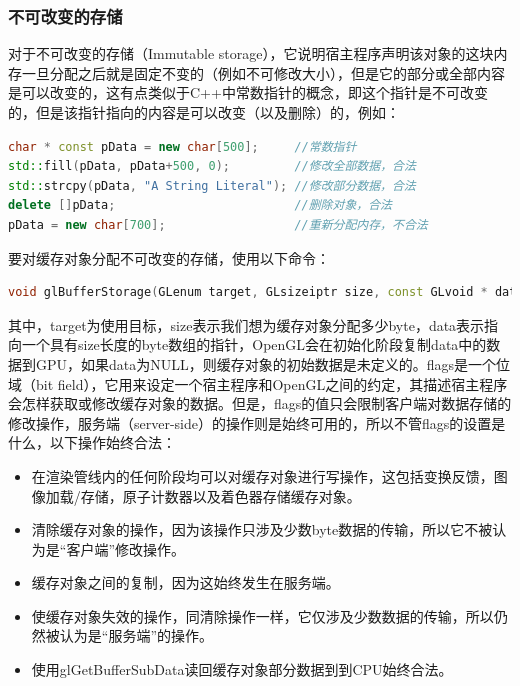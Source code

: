 \subsubsection{不可改变的存储}
对于不可改变的存储（Immutable storage），它说明宿主程序声明该对象的这块内存一旦分配之后就是固定不变的（例如不可修改大小），但是它的部分或全部内容是可以改变的，这有点类似于C++中常数指针的概念，即这个指针是不可改变的，但是该指针指向的内容是可以改变（以及删除）的，例如：

\begin{lstlisting}[language=C++]
char * const pData = new char[500];     //常数指针
std::fill(pData, pData+500, 0);         //修改全部数据，合法
std::strcpy(pData, "A String Literal"); //修改部分数据，合法
delete []pData;                         //删除对象，合法
pData = new char[700];                  //重新分配内存，不合法
\end{lstlisting}

要对缓存对象分配不可改变的存储，使用以下命令：

\begin{lstlisting}[language=C++]
void glBufferStorage​(GLenum target​, GLsizeiptr size​, const GLvoid * data​, GLbitfield flags​);
\end{lstlisting}

其中，target为使用目标，size表示我们想为缓存对象分配多少byte，data表示指向一个具有size长度的byte数组的指针，OpenGL会在初始化阶段复制data中的数据到GPU，如果data为NULL，则缓存对象的初始数据是未定义的。flags是一个位域（bit field），它用来设定一个宿主程序和OpenGL之间的约定，其描述宿主程序会怎样获取或修改缓存对象的数据。但是，flags的值只会限制客户端对数据存储的修改操作，服务端（server-side）的操作则是始终可用的，所以不管flags的设置是什么，以下操作始终合法：

\begin{itemize}
	\item 在渲染管线内的任何阶段均可以对缓存对象进行写操作，这包括变换反馈，图像加载/存储，原子计数器以及着色器存储缓存对象。
	\item 清除缓存对象的操作，因为该操作只涉及少数byte数据的传输，所以它不被认为是“客户端”修改操作。
	\item 缓存对象之间的复制，因为这始终发生在服务端。
	\item 使缓存对象失效的操作，同清除操作一样，它仅涉及少数数据的传输，所以仍然被认为是“服务端”的操作。
	\item 使用glGetBufferSubData读回缓存对象部分数据到到CPU始终合法。
\end{itemize}

